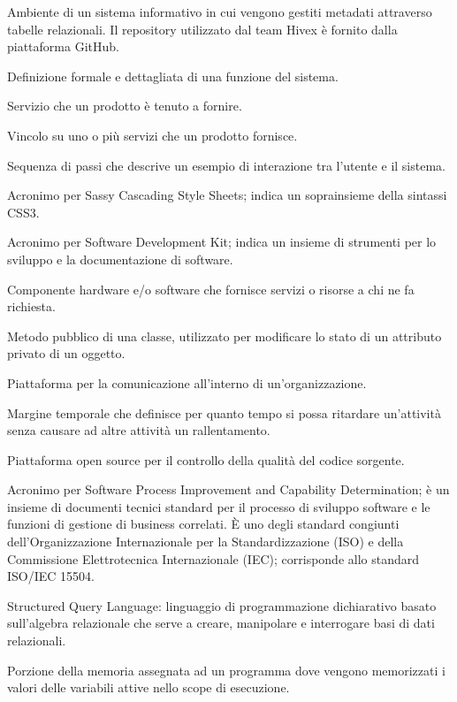 \item[repository] Ambiente di un sistema informativo in cui vengono gestiti metadati attraverso tabelle relazionali. Il repository utilizzato dal team Hivex è fornito dalla piattaforma GitHub.
\item[requisito di sistema] Definizione formale e dettagliata di una funzione del sistema.
\item[requisito funzionale] Servizio che un prodotto è tenuto a fornire.
\item[requisito non funzionale] Vincolo su uno o più servizi che un prodotto fornisce.
\item[scenario] Sequenza di passi che descrive un esempio di interazione tra l'utente e il sistema.
\item[SCSS] Acronimo per Sassy Cascading Style Sheets; indica un soprainsieme della sintassi CSS3.
\item[SDK] Acronimo per Software Development Kit; indica un insieme di strumenti per lo sviluppo e la documentazione di software.
\item[server] Componente hardware e/o software che fornisce servizi o risorse a chi ne fa richiesta.
\item[setter] Metodo pubblico di una classe, utilizzato per modificare lo stato di un attributo privato di un oggetto.
\item[Slack] Piattaforma per la comunicazione all'interno di un'organizzazione.
\item[ periodo di slack] Margine temporale che definisce per quanto tempo si possa ritardare un’attività senza causare ad altre attività un rallentamento.
\item[SonarQube] Piattaforma open source per il controllo della qualità del codice sorgente.
\item[SPICE] Acronimo per Software Process Improvement and Capability Determination; è un insieme di documenti tecnici standard per il processo di sviluppo software e le funzioni di gestione di business correlati. È uno degli standard congiunti dell’Organizzazione Internazionale per la Standardizzazione (ISO) e della Commissione Elettrotecnica Internazionale (IEC); corrisponde allo standard ISO/IEC 15504.
\item[SQL] Structured Query Language: linguaggio di programmazione dichiarativo basato sull'algebra relazionale che serve a creare, manipolare e interrogare basi di dati relazionali.
\item[stack] Porzione della memoria assegnata ad un programma dove vengono memorizzati i valori delle variabili attive nello scope di esecuzione.
